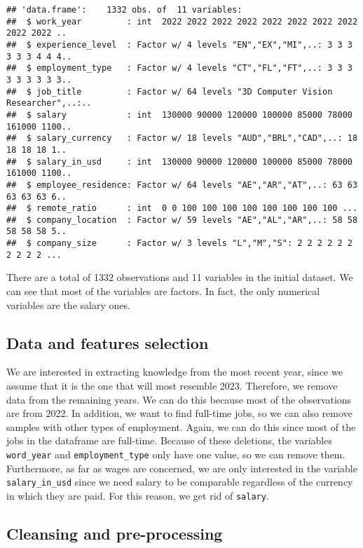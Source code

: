 \documentclass[
]{article}
\begin{document}
\begin{verbatim}
## 'data.frame':    1332 obs. of  11 variables:
##  $ work_year         : int  2022 2022 2022 2022 2022 2022 2022 2022 2022 2022 ..
##  $ experience_level  : Factor w/ 4 levels "EN","EX","MI",..: 3 3 3 3 3 3 4 4 4..
##  $ employment_type   : Factor w/ 4 levels "CT","FL","FT",..: 3 3 3 3 3 3 3 3 3..
##  $ job_title         : Factor w/ 64 levels "3D Computer Vision Researcher",..:..
##  $ salary            : int  130000 90000 120000 100000 85000 78000 161000 1100..
##  $ salary_currency   : Factor w/ 18 levels "AUD","BRL","CAD",..: 18 18 18 18 1..
##  $ salary_in_usd     : int  130000 90000 120000 100000 85000 78000 161000 1100..
##  $ employee_residence: Factor w/ 64 levels "AE","AR","AT",..: 63 63 63 63 63 6..
##  $ remote_ratio      : int  0 0 100 100 100 100 100 100 100 100 ...
##  $ company_location  : Factor w/ 59 levels "AE","AL","AR",..: 58 58 58 58 58 5..
##  $ company_size      : Factor w/ 3 levels "L","M","S": 2 2 2 2 2 2 2 2 2 2 ...
\end{verbatim}

\normalsize

There are a total of 1332 observations and 11 variables in the initial
dataset. We can see that most of the variables are factors. In fact, the
only numerical variables are the salary ones.

\hypertarget{data-and-features-selection}{%
\subsection{Data and features
selection}\label{data-and-features-selection}}

We are interested in extracting knowledge from the most recent year,
since we assume that it is the one that will most resemble 2023.
Therefore, we remove data from the remaining years. We can do this
because most of the observations are from 2022. In addition, we want to
find full-time jobs, so we can also remove samples with other types of
employment. Again, we can do this since most of the jobs in the
dataframe are full-time. Because of these deletions, the variables
\texttt{word\_year} and \texttt{employment\_type} only have one value,
so we can remove them. Furthermore, as far as wages are concerned, we
are only interested in the variable \texttt{salary\_in\_usd} since we
need salary to be comparable regardless of the currency in which they
are paid. For this reason, we get rid of \texttt{salary}.

\hypertarget{cleansing-and-pre-processing}{%
\subsection{Cleansing and
pre-processing}\label{cleansing-and-pre-processing}}
\end{document}
